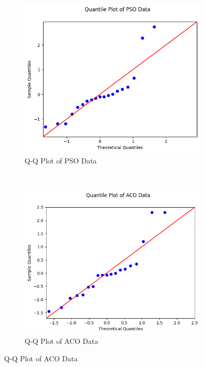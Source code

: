 \documentclass{report}
\begin{document}
\begin{figure}[H]
	\begin{subfigure}{0.4\textwidth}
		\centering
		\includegraphics[width=\textwidth]{images/pso_qq}
		\caption{Q-Q Plot of PSO Data}
		\label{fig:qqpso}
	\end{subfigure}
	~
	\begin{subfigure}{0.4\textwidth}
		\centering
		\includegraphics[width=\textwidth]{images/aco_qq}
		\caption{Q-Q Plot of ACO Data}
		\label{fig:qqaco}
	\end{subfigure}

\end{figure}
\end{document}
